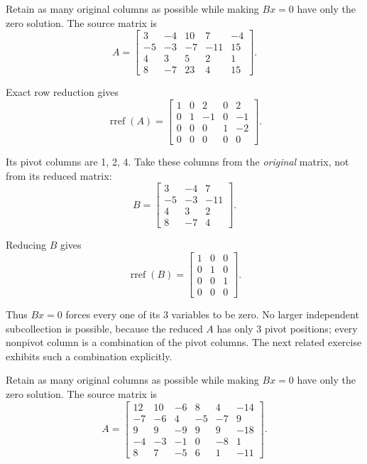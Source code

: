
\goal Retain as many original columns as possible while making $Bx=0$ have only the zero solution. The source matrix is
\[ A=\begin{bmatrix}3 & -4 & 10 & 7 & -4\\-5 & -3 & -7 & -11 & 15\\4 & 3 & 5 & 2 & 1\\8 & -7 & 23 & 4 & 15\end{bmatrix}.\]

Exact row reduction gives
\[ \operatorname{rref}(A)=\begin{bmatrix}1 & 0 & 2 & 0 & 2\\0 & 1 & -1 & 0 & -1\\0 & 0 & 0 & 1 & -2\\0 & 0 & 0 & 0 & 0\end{bmatrix}.\]

Its pivot columns are 1, 2, 4. Take these columns from the \emph{original} matrix, not from its reduced matrix:
\[ B=\begin{bmatrix}3 & -4 & 7\\-5 & -3 & -11\\4 & 3 & 2\\8 & -7 & 4\end{bmatrix}.\]

Reducing $B$ gives
\[ \operatorname{rref}(B)=\begin{bmatrix}1 & 0 & 0\\0 & 1 & 0\\0 & 0 & 1\\0 & 0 & 0\end{bmatrix}.\]

Thus $Bx=0$ forces every one of its 3 variables to be zero. No larger independent subcollection is possible, because the reduced $A$ has only 3 pivot positions; every nonpivot column is a combination of the pivot columns. The next related exercise exhibits such a combination explicitly.



\goal Retain as many original columns as possible while making $Bx=0$ have only the zero solution. The source matrix is
\[ A=\begin{bmatrix}12 & 10 & -6 & 8 & 4 & -14\\-7 & -6 & 4 & -5 & -7 & 9\\9 & 9 & -9 & 9 & 9 & -18\\-4 & -3 & -1 & 0 & -8 & 1\\8 & 7 & -5 & 6 & 1 & -11\end{bmatrix}.\]

